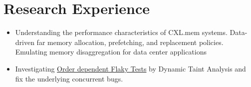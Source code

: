 \documentclass{resume}
\newcommand{\en}[1]{#1}
\newcommand{\zh}[1]{}
\begin{document}
\section{\en{Research Experience}\zh{研究经历}}

\en{}
\zh{\datedsubsection{\textbf{\href{https://www.ssrc.ucsc.edu/index.html}{加州大学圣克鲁兹分校存储中心}}}{08/2022 -- 现在}}
\en{}
\zh{\role{研究生科研}{助理}}
\begin{itemize}
      \item \small{ \en{Understanding the performance characteristics of CXL.mem systems. Data-driven far memory allocation, prefetching, and replacement policies. Emulating memory disaggregation for data center applications}
      \zh{理解CXL.mem的性能分析。数据驱动的远端内存分配、预取和替换策略。模拟数据中心应用的内存。}}
      
\end{itemize}

\en{}
\zh{\datedsubsection{\textbf{\href{https://illinois.edu}{伊利诺伊大学厄巴纳-香槟分校}\href{http://mir.cs.illinois.edu/marinov/}{Darko Marinov组}}}{2021/07 -- 2021/10}}
\en{}
\zh{\role{本科生科研}{暑研项目}}
\begin{itemize}
      \item \en{Investigating \href{https://victoryang00.cn/wordpress/2022/08/09/final-report-of-program-analysis/}{Order dependent Flaky Tests} by Dynamic Taint Analysis and fix the underlying concurrent bugs.}
            \zh{使用动态污点分析在Flaky数据集上进行\href{https://victoryang00.cn/wordpress/2022/08/09/final-report-of-program-analysis/}{数据依赖变量检测}，并修复java写的并行系统中的并发bug。}
\end{itemize}
\end{document}
